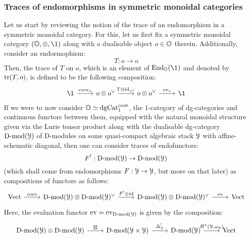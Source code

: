             \subsubsection{Traces of endomorphisms in symmetric monoidal categories}
                Let us start by reviewing the notion of the trace of an endomorphism in a symmetric monoidal category. For this, let us first fix a symmetric monoidal category $(\O, \tensor, \1)$ along with a dualisable object $o \in \mathbb{O}$ therein. Additionally, consider an endormophism:
                    $$T: o \to o$$
                Then, the trace of $T$ on $o$, which is an element of $\End_{\O}(\1)$ and denoted by $\operatorname{tr}(T, o)$, is defined to be the following composition:
                    $$
                        \begin{tikzcd}
                        	\1 & {o \tensor o^{\vee}} & {o \tensor o^{\vee}} & \1
                        	\arrow["{T \tensor \id_{o^{\vee}}}", from=1-2, to=1-3]
                        	\arrow["\ev_o", from=1-3, to=1-4]
                        	\arrow["\co\ev_o", from=1-1, to=1-2]
                        \end{tikzcd}
                    $$
                If we were to now consider $\mathbb{O} \simeq \mathrm{dg}\mathrm{Cat}_1^{\mathrm{cont}}$, the $1$-category of dg-categories and continuous functors between them, equipped with the natural monoidal structure given via the Lurie tensor product along with the dualisable dg-category $\mathrm{D}\text{-}\mathrm{mod}(\mathcal{Y})$ of D-modules on some quasi-compact algebraic stack $\mathcal{Y}$ with affine-schematic diagonal, then one can consider traces of endofunctors:
                    $$F^!: \mathrm{D}\text{-}\mathrm{mod}(\mathcal{Y}) \to \mathrm{D}\text{-}\mathrm{mod}(\mathcal{Y})$$
                (which shall come from endomorphisms $F: \mathcal{Y} \to \mathcal{Y}$, but more on that later) as compositions of functors as follows:
                    $$
                        \begin{tikzcd}
                        	\Vect & {\Dmod(\calY) \tensor \Dmod(\calY)^{\vee}} & {\Dmod(\calY) \tensor \Dmod(\calY)^{\vee}} & \Vect
                        	\arrow["{F^! \tensor \id}", from=1-2, to=1-3]
                        	\arrow["\ev", from=1-3, to=1-4]
                        	\arrow["\co\ev", from=1-1, to=1-2]
                        \end{tikzcd}
                    $$
                Here, the evaluation functor $\mathrm{ev} = \mathrm{ev}_{\mathrm{D}\text{-}\mathrm{mod}(\mathcal{Y})}$ is given by the composition:
                    $$
                        \begin{tikzcd}
                        	{\Dmod(\calY) \tensor \Dmod(\calY)} & {\Dmod(\calY \x \calY)} & {\Dmod(\calY)} & \Vect
                        	\arrow["\boxtimes", from=1-1, to=1-2]
                        	\arrow["{\Delta_{\calY}^!}", from=1-2, to=1-3]
                        	\arrow["{H^*(\calY, \omega_{\calY})}", from=1-3, to=1-4]
                        \end{tikzcd}
                    $$
            
